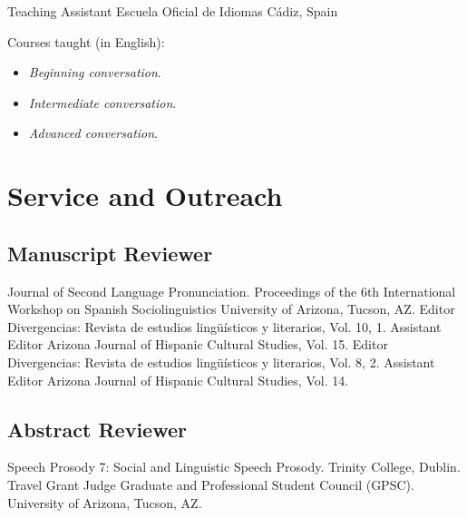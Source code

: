 \documentclass[12pt,letterpaper]{moderncv}
\begin{document}
        {Teaching Assistant}
        {Escuela Oficial de Idiomas}
        {C\'adiz, Spain}
        {}
        {Courses taught (in English):
        \begin{itemize}
          \item[] \small \emph{Beginning conversation}.\vspace{-.03in}
          \item[] \small \emph{Intermediate conversation}.\vspace{-.03in}
          \item[] \small \emph{Advanced conversation}.
        \end{itemize}}










\section{Service and Outreach}

\subsection{Manuscript Reviewer}
        {Journal of Second Language Pronunciation.}
        {}
        {}
        {}
        {}
        {Proceedings of the 6th International Workshop on Spanish Sociolinguistics}
        {}
        {}
        {}
        {University of Arizona, Tucson, AZ.}
        {Editor}
        {Divergencias: Revista de estudios ling\"u\'isticos y literarios, Vol. 10, 1.}
        {}
        {}
        {}
        {Assistant Editor}
        {Arizona Journal of Hispanic Cultural Studies, Vol. 15.}
        {}
        {}
        {}
        {Editor}
        {Divergencias: Revista de estudios ling\"u\'isticos y literarios, Vol. 8, 2.}
        {}
        {}
        {}
        {Assistant Editor}
        {Arizona Journal of Hispanic Cultural Studies, Vol. 14.}
        {}
        {}
        {}

\subsection{Abstract Reviewer}
        {Speech Prosody 7: Social and Linguistic Speech Prosody.}
        {}
        {}
        {}
        {Trinity College, Dublin.}
        {Travel Grant Judge}
        {Graduate and Professional Student Council (GPSC).}
        {}
        {}
        {University of Arizona, Tucson, AZ.}
\end{document}
